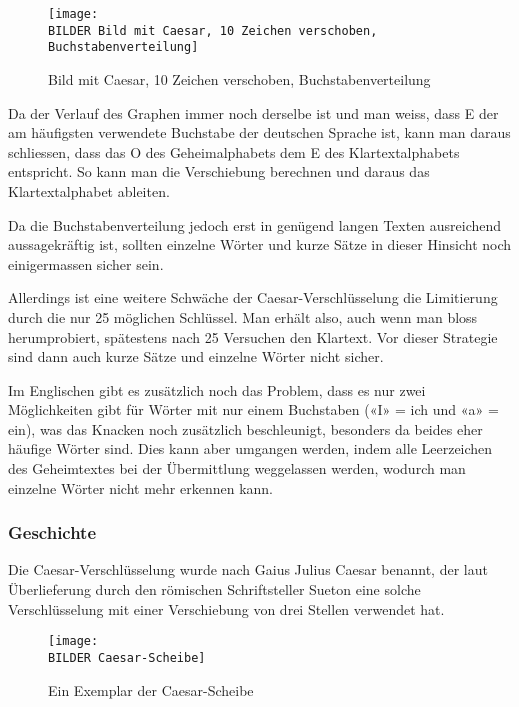 \begin{figure}[htb]  %
	\centering
		\texttt{[image: \\BILDER Bild mit Caesar, 10 Zeichen verschoben, Buchstabenverteilung]}
 	\caption{Bild mit Caesar, 10 Zeichen verschoben, Buchstabenverteilung \cite{img:citekey}}
  \label{fig:verteilung-buchstaben-caesar-10}
\end{figure}

Da der Verlauf des Graphen immer noch derselbe ist und man weiss, dass E der am häufigsten verwendete Buchstabe der deutschen Sprache ist, kann man daraus schliessen, dass das O des Geheimalphabets dem E des Klartextalphabets entspricht. So kann man die Verschiebung berechnen und daraus das Klartextalphabet ableiten.

Da die Buchstabenverteilung jedoch erst in genügend langen Texten ausreichend aussagekräftig ist, sollten einzelne Wörter und kurze Sätze in dieser Hinsicht noch einigermassen sicher sein.

Allerdings ist eine weitere Schwäche der Caesar-Verschlüsselung die Limitierung durch die nur 25 möglichen Schlüssel. Man erhält also, auch wenn man bloss herumprobiert, spätestens nach 25 Versuchen den Klartext. Vor dieser Strategie sind dann auch kurze Sätze und einzelne Wörter nicht sicher.

Im Englischen gibt es zusätzlich noch das Problem, dass es nur zwei Möglichkeiten gibt für Wörter mit nur einem Buchstaben («I» = ich und «a» = ein), was das Knacken noch zusätzlich beschleunigt, besonders da beides eher häufige Wörter sind. Dies kann aber umgangen werden, indem alle Leerzeichen des Geheimtextes bei der Übermittlung weggelassen werden, wodurch man einzelne Wörter nicht mehr erkennen kann.


\subsubsection{Geschichte}
\label{sec:c-geschichte}
Die Caesar-Verschlüsselung wurde nach Gaius Julius Caesar benannt, der laut Überlieferung durch den römischen Schriftsteller Sueton eine solche Verschlüsselung mit einer Verschiebung von drei Stellen verwendet hat.

\begin{figure}[htb]  %
	\centering
		\texttt{[image: \\BILDER Caesar-Scheibe]}
 	\caption{Ein Exemplar der Caesar-Scheibe \cite{img:citekey}}
  \label{fig:caesar-scheibe}
\end{figure}

